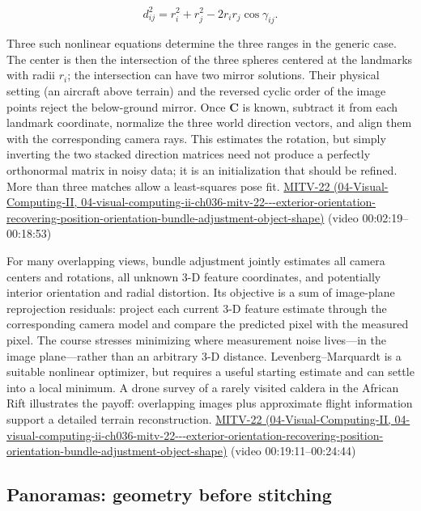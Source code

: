 \[
d_{ij}^2=r_i^2+r_j^2-2r_ir_j\cos\gamma_{ij}.
\]

Three such nonlinear equations determine the three ranges in the generic case. The center is then the intersection of the three spheres centered at the landmarks with radii \(r_i\); the intersection can have two mirror solutions. Their physical setting (an aircraft above terrain) and the reversed cyclic order of the image points reject the below-ground mirror. Once \(\mathbf C\) is known, subtract it from each landmark coordinate, normalize the three world direction vectors, and align them with the corresponding camera rays. This estimates the rotation, but simply inverting the two stacked direction matrices need not produce a perfectly orthonormal matrix in noisy data; it is an initialization that should be refined. More than three matches allow a least-squares pose fit. \href{../04-Visual-Computing-II/main.pdf\#nameddest=04-visual-computing-ii-ch036-mitv-22---exterior-orientation-recovering-position-orientation-bundle-adjustment-object-shape}{MITV-22 (04-Visual-Computing-II, 04-visual-computing-ii-ch036-mitv-22-\/-\/-exterior-orientation-recovering-position-orientation-bundle-adjustment-object-shape)} (video 00:02:19--00:18:53)

For many overlapping views, bundle adjustment jointly estimates all camera centers and rotations, all unknown 3-D feature coordinates, and potentially interior orientation and radial distortion. Its objective is a sum of image-plane reprojection residuals: project each current 3-D feature estimate through the corresponding camera model and compare the predicted pixel with the measured pixel. The course stresses minimizing where measurement noise lives---in the image plane---rather than an arbitrary 3-D distance. Levenberg--Marquardt is a suitable nonlinear optimizer, but requires a useful starting estimate and can settle into a local minimum. A drone survey of a rarely visited caldera in the African Rift illustrates the payoff: overlapping images plus approximate flight information support a detailed terrain reconstruction. \href{../04-Visual-Computing-II/main.pdf\#nameddest=04-visual-computing-ii-ch036-mitv-22---exterior-orientation-recovering-position-orientation-bundle-adjustment-object-shape}{MITV-22 (04-Visual-Computing-II, 04-visual-computing-ii-ch036-mitv-22-\/-\/-exterior-orientation-recovering-position-orientation-bundle-adjustment-object-shape)} (video 00:19:11--00:24:44)

\subsection{Panoramas: geometry before stitching}\label{03-visual-computing-i-ch003-panoramas-geometry-before-stitching}

